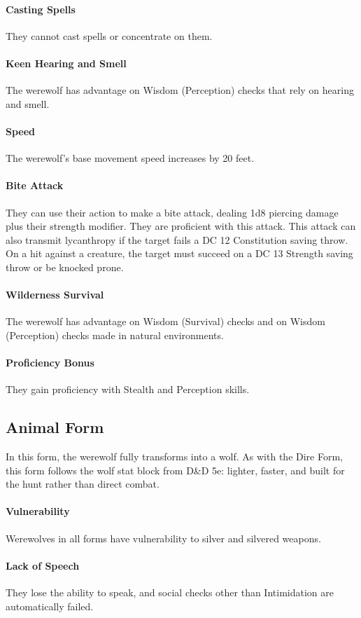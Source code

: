 \documentclass[twocolumn]{dndbook}
\begin{document}
\paragraph*{Casting Spells} They cannot cast spells or concentrate on them.
\paragraph*{Keen Hearing and Smell} The werewolf has advantage on Wisdom (Perception) checks that rely on hearing and smell.
\paragraph*{Speed} The werewolf's base movement speed increases by 20 feet.
\paragraph*{Bite Attack} They can use their action to make a bite attack, dealing 1d8 piercing damage plus their strength modifier. They are proficient with this attack. This attack can also transmit lycanthropy if the target fails a DC 12 Constitution saving throw. On a hit against a creature, the target must succeed on a DC 13 Strength saving throw or be knocked prone.
\paragraph*{Wilderness Survival} The werewolf has advantage on Wisdom (Survival) checks and on Wisdom (Perception) checks made in natural environments.
\paragraph*{Proficiency Bonus} They gain proficiency with Stealth and Perception skills.

\subsection*{Animal Form}
In this form, the werewolf fully transforms into a wolf.
As with the Dire Form, this form follows the wolf stat block from D\&D 5e: lighter, faster, and built for the hunt rather than direct combat.
\paragraph*{Vulnerability} Werewolves in all forms have vulnerability to silver and silvered weapons.
\paragraph*{Lack of Speech} They lose the ability to speak, and social checks other than Intimidation are automatically failed.
\end{document}
